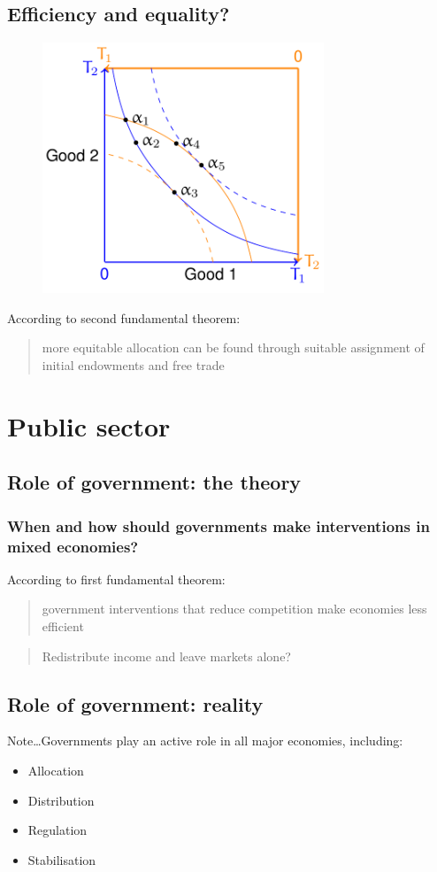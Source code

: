 \documentclass[class=report, crop=false, 12pt,a4paper]{standalone}
\begin{document}
\subsection{Efficiency and equality?}
\begin{figure}[H]
	\centering
	\includegraphics[width =0.5 \textwidth]{../img/figure12.png}
	\caption{}
\end{figure}
According to second fundamental theorem:
\begin{quote}
	more equitable allocation can be found through suitable assignment of initial endowments and free trade
\end{quote}
\section{Public sector}
\subsection{Role of government: the theory}
\subsubsection{When and how should governments make interventions in mixed economies?}
According to first fundamental theorem:
\begin{quote}
	government interventions that reduce competition make economies less efficient
\end{quote}
\begin{quote}
	Redistribute income and leave markets alone?
\end{quote}
\subsection{Role of government: reality}
Note\dots Governments play an active role in all major economies, including:
\begin{itemize}
	\item Allocation
	\item Distribution
	\item Regulation
	\item Stabilisation
\end{itemize}
\end{document}
